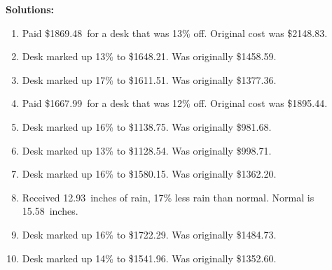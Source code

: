\documentclass[12pt]{amsart}
\begin{document}
\begin{enumerate}
\vfill 
\newpage\end{enumerate} {\bf Solutions:}\begin{enumerate}\def \discount{13}\def \paid{1869.48}\def \rainy{13.69}\def \orcost{2148.83}\def \purcost{1654.41}\def \orrainy{15.74}
\item Paid \$\paid\ for a desk that was \discount\% off. Original cost was \$\orcost. 
\def \discount{13}\def \paid{1648.21}\def \rainy{8.81}\def \orcost{1894.49}\def \purcost{1458.59}\def \orrainy{10.13}
\item Desk marked up \discount\% to \$\paid. Was originally \$\purcost. 
\def \discount{17}\def \paid{1611.51}\def \rainy{10.14}\def \orcost{1941.58}\def \purcost{1377.36}\def \orrainy{12.22}
\item Desk marked up \discount\% to \$\paid. Was originally \$\purcost. 
\def \discount{12}\def \paid{1667.99}\def \rainy{14.11}\def \orcost{1895.44}\def \purcost{1489.28}\def \orrainy{16.03}
\item Paid \$\paid\ for a desk that was \discount\% off. Original cost was \$\orcost. 
\def \discount{16}\def \paid{1138.75}\def \rainy{12.93}\def \orcost{1355.65}\def \purcost{981.68}\def \orrainy{15.39}
\item Desk marked up \discount\% to \$\paid. Was originally \$\purcost. 
\def \discount{13}\def \paid{1128.54}\def \rainy{8.89}\def \orcost{1297.17}\def \purcost{998.71}\def \orrainy{10.22}
\item Desk marked up \discount\% to \$\paid. Was originally \$\purcost. 
\def \discount{16}\def \paid{1580.15}\def \rainy{13.54}\def \orcost{1881.13}\def \purcost{1362.20}\def \orrainy{16.12}
\item Desk marked up \discount\% to \$\paid. Was originally \$\purcost. 
\def \discount{17}\def \paid{1430.82}\def \rainy{12.93}\def \orcost{1723.88}\def \purcost{1222.92}\def \orrainy{15.58}
\item Received \rainy\ inches of rain, \discount\% less rain than normal. Normal is \orrainy\ inches.
\def \discount{16}\def \paid{1722.29}\def \rainy{11.38}\def \orcost{2050.35}\def \purcost{1484.73}\def \orrainy{13.55}
\item Desk marked up \discount\% to \$\paid. Was originally \$\purcost. 
\def \discount{14}\def \paid{1541.96}\def \rainy{9.25}\def \orcost{1792.98}\def \purcost{1352.60}\def \orrainy{10.76}
\item Desk marked up \discount\% to \$\paid. Was originally \$\purcost. 
\def \discount{14}\def \paid{1796.14}\def \rainy{10.19}\def \orcost{2088.53}\def \purcost{1575.56}\def \orrainy{11.85}

\end{enumerate}
\end{document}

